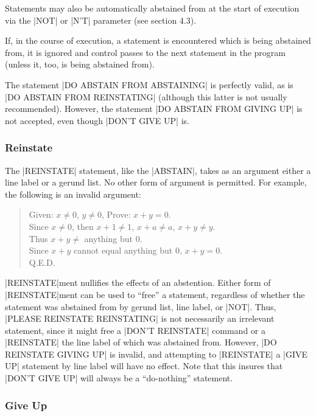Statements may also be automatically abstained from at the start of
execution via the |NOT| or |N'T| parameter (see section 4.3).


If, in the course of execution, a statement is encountered which is being
abstained from, it is ignored and control passes to the next statement in
the program (unless it, too, is being abstained from).

The statement |DO ABSTAIN FROM ABSTAINING| is perfectly valid, as is |DO
ABSTAIN FROM REINSTATING| (although this latter is not usually
recommended).  However, the statement |DO ABSTAIN FROM GIVING UP| is not
accepted, even though |DON'T GIVE UP| is.

\subsubsection{Reinstate}
\newlength{\QEDlen}\settowidth{\QEDlen}{Q.E.D.}\newlength{\lastlinelen}
\settowidth{\lastlinelen}{Since $x+y$ cannot equal anything but 0, $x+y=0$.}
\addtolength{\lastlinelen}{-1\QEDlen}

The |REINSTATE| statement, like the |ABSTAIN|, takes as an argument either
a line label or a gerund list.  No other form of argument is permitted.
For example, the following is an invalid argument:
\begin{quote}
        Given: $x\neq0$, $y\neq0$,  Prove: $x+y=0$. \\
        Since $x\neq0$, then $x+1\neq1$, $x+a\neq a$, $x+y\neq y$. \\
        Thus $x+y \neq$ anything but 0. \\
        Since $x+y$ cannot equal anything but 0, $x+y=0$. \\
	\hspace*{\lastlinelen} Q.E.D.
\end{quote}

|REINSTATE|ment nullifies the effects of an abstention.  Either form of
|REINSTATE|ment can be used to ``free'' a statement, regardless of whether
the statement was abstained from by gerund list, line label, or |NOT|.
Thus, |PLEASE REINSTATE REINSTATING| is not necessarily an irrelevant
statement, since it might free a |DON'T REINSTATE| command or a |REINSTATE|
the line label of which was abstained from.  However, |DO REINSTATE GIVING
UP| is invalid, and attempting to |REINSTATE| a |GIVE UP| statement by line
label will have no effect.  Note that this insures that |DON'T GIVE UP|
will always be a ``do-nothing'' statement.

\subsubsection{Give Up}

